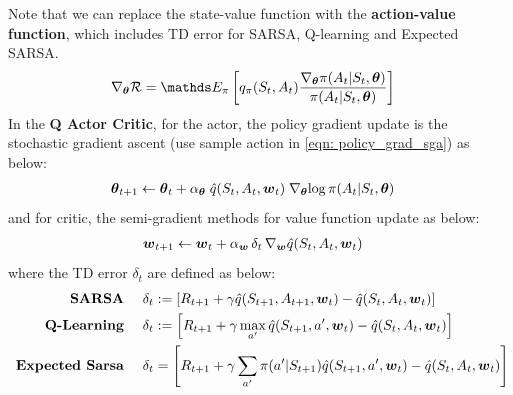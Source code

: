 \documentclass[11pt]{article}
\begin{document}
Note that we can replace the state-value function with the  \textbf{action-value function}, which includes TD error for SARSA, Q-learning and Expected SARSA. 
\begin{align*}
\grad{\mb{\theta}}{\cR} &= \E{\pi}{q_{\pi}(S_{t}, A_{t}) \frac{\grad{\mb{\theta}}{\pi(A_{t}|S_{t}, \mb{\theta})}}{\pi(A_{t}|S_{t}, \mb{\theta})} }
\end{align*} In the \textbf{Q Actor Critic}, for the actor, the policy gradient update is the stochastic gradient ascent (use sample action in \eqref{eqn: policy_grad_sga}) as below: 
\begin{align}
\boldsymbol{\theta}_{t+1} &\leftarrow  \boldsymbol{\theta}_{t} + \alpha_{\boldsymbol{\theta}}\;\hat{q}(S_{t}, A_{t}, \boldsymbol{w}_{t}) \;\nabla_{\boldsymbol{\theta}}{\log\pi(A_{t}|S_{t}, \boldsymbol{\theta})} \nonumber
\end{align} and for critic, the semi-gradient methods for value function update as below:
\begin{align}
\boldsymbol{w}_{t+1} &\leftarrow  \boldsymbol{w}_{t} + \alpha_{\boldsymbol{w}}\, \delta_{t}\,\nabla_{\boldsymbol{w}}{\hat{q}(S_{t}, A_{t}, \boldsymbol{w}_{t})}  \nonumber
\end{align} where the TD error $\delta_t$ are defined as below:  
\begin{align}
\text{  \textbf{SARSA} }\quad \delta_{t}&:=\left[R_{t+1} + \gamma \hat{q}(S_{t+1}, A_{t+1}, \boldsymbol{w}_{t}) - \hat{q}(S_{t}, A_{t}, \boldsymbol{w}_{t})\right]  \label{eqn: semi_grad_sarsa}\\
\text{  \textbf{Q-Learning} }\quad \delta_{t}&:=\left[R_{t+1} + \gamma \max_{a'}\hat{q}(S_{t+1}, a', \boldsymbol{w}_{t}) - \hat{q}(S_{t}, A_{t}, \boldsymbol{w}_{t})\right]   \label{eqn: semi_grad_q_learning}\\
 \text{  \textbf{Expected Sarsa} }\quad \delta_{t} &= \left[R_{t+1} +\gamma\sum_{a'}\pi(a'|S_{t+1})\hat{q}(S_{t+1}, a', \boldsymbol{w}_{t}) - \hat{q}(S_{t}, A_{t}, \boldsymbol{w}_{t})\right]  \label{eqn: semi_grad_exp_sarsa} 
\end{align}





\newpage


\end{document}
